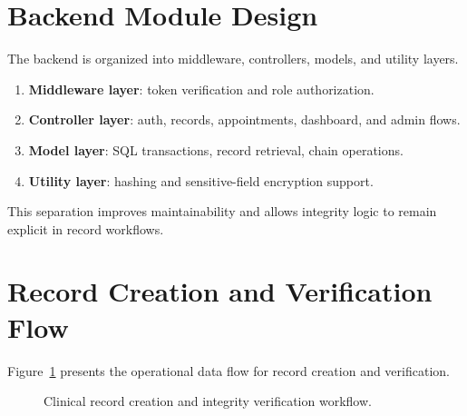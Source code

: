 \documentclass[12pt,a4paper]{report}
\begin{document}
\section{Backend Module Design}

The backend is organized into middleware, controllers, models, and utility layers.

\begin{enumerate}
\item \textbf{Middleware layer}: token verification and role authorization.
\item \textbf{Controller layer}: auth, records, appointments, dashboard, and admin flows.
\item \textbf{Model layer}: SQL transactions, record retrieval, chain operations.
\item \textbf{Utility layer}: hashing and sensitive-field encryption support.
\end{enumerate}

This separation improves maintainability and allows integrity logic to remain explicit in record workflows.

\section{Record Creation and Verification Flow}

Figure~\ref{fig:record-create-verify-flow} presents the operational data flow for record creation and verification.

\begin{figure}[htbp]
\centering
{}
\caption{Clinical record creation and integrity verification workflow.}
\label{fig:record-create-verify-flow}
\end{figure}
\end{document}
